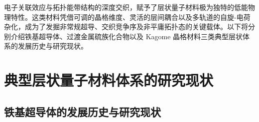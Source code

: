 
电子关联效应与拓扑能带结构的深度交织，赋予了层状量子材料极为独特的低能物理特性。这类材料凭借可调的晶格维度、灵活的层间耦合以及多轨道的自旋-电荷杂化，成为了发掘非常规超导、交织竞争序及非平庸拓扑态的关键载体。以下将分别介绍铁基超导体、过渡金属硫族化合物以及 Kagome 晶格材料三类典型层状体系的发展历史与研究现状。
\section{典型层状量子材料体系的研究现状}
\subsection{铁基超导体的发展历史与研究现状}
